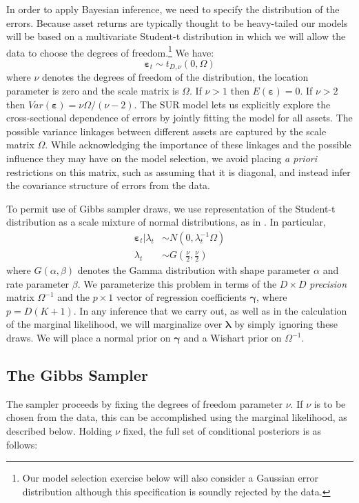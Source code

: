 In order to apply Bayesian inference, we need to specify the distribution of the errors. 
Because asset returns are typically thought to be heavy-tailed our models will be based on a multivariate Student-t distribution in which we will allow the data to choose the degrees of freedom.\footnote{Our model selection exercise below will also consider a Gaussian error distribution although this specification is soundly rejected by the data.}
We have:
\begin{equation*}
\boldsymbol{\varepsilon}_{t}\sim t_{D,\nu }\left( 0,\Omega \right)
\end{equation*}
where $\nu$ denotes the degrees of freedom of the distribution, the location parameter is zero and the scale matrix is $\Omega$.
If $\nu >1$ then $E(\boldsymbol{\varepsilon}) = 0$. 
If $\nu>2$ then $Var\left( \boldsymbol{\varepsilon} \right) = \nu \Omega/(\nu-2)$. 
The SUR model lets us explicitly explore the cross-sectional dependence of errors by jointly fitting the model for all assets. 
The possible variance linkages between different assets are captured by the scale matrix $\Omega$. 
While acknowledging the importance of these linkages and the possible influence they may have on the model selection, we avoid placing \emph{a priori} restrictions on this matrix, such as assuming that it is diagonal, and instead infer the covariance structure of errors from the data.

To permit use of Gibbs sampler draws, we use representation of the Student-t distribution as a scale mixture of normal distributions, as in \cite{chib1995hierarchical}.
In particular,
\begin{eqnarray*}
\boldsymbol{\varepsilon}_{t}|\lambda _{t} &\sim N\left( 0,\lambda _{t}^{-1}\Omega \right)
\\
\lambda _{t} &\sim G\left( \frac{\nu }{2},\frac{\nu }{2}\right)
\end{eqnarray*}
where $G(\alpha,\beta)$ denotes the Gamma distribution with shape parameter $\alpha$ and rate parameter $\beta$. 
We parameterize this problem in terms of the $D\times D$ \emph{precision} matrix $\Omega^{-1}$ and the $p\times1$ vector of regression coefficients $\boldsymbol{\gamma}$, where $p = D(K+1)$. 
In any inference that we carry out, as well as in the calculation of the marginal likelihood, we will marginalize over $\boldsymbol{\lambda}$ by simply ignoring these draws.
We will place a normal prior on $\boldsymbol{\gamma}$ and a Wishart prior on $\Omega^{-1}$. 

\subsection{The Gibbs Sampler}
The sampler proceeds by fixing the degrees of freedom parameter $\nu$.
If $\nu$ is to be chosen from the data, this can be accomplished using the marginal likelihood, as described below.
Holding $\nu$ fixed, the full set of conditional posteriors is as follows:

